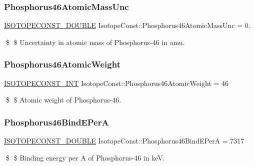 \subsubsection{\texorpdfstring{Phosphorus46\+Atomic\+Mass\+Unc}{Phosphorus46AtomicMassUnc}}
{\footnotesize\ttfamily \mbox{\hyperlink{group___isotope_const-_macros_ga8f45a7272ce02c0b4c65c44636ed719a}{I\+S\+O\+T\+O\+P\+E\+C\+O\+N\+S\+T\+\_\+\+D\+O\+U\+B\+LE}} Isotope\+Const\+::\+Phosphorus46\+Atomic\+Mass\+Unc = 0.}

\$ \$ Uncertainty in atomic mass of Phosphorus-\/46 in amu. \mbox{\label{group___isotope_const-_phosphorus-_p46_ga57d067ce0aacc24abadc3f92997ab879}} 
\subsubsection{\texorpdfstring{Phosphorus46\+Atomic\+Weight}{Phosphorus46AtomicWeight}}
{\footnotesize\ttfamily \mbox{\hyperlink{group___isotope_const-_macros_ga5f18360b3e99483a35c32d789e62621c}{I\+S\+O\+T\+O\+P\+E\+C\+O\+N\+S\+T\+\_\+\+I\+NT}} Isotope\+Const\+::\+Phosphorus46\+Atomic\+Weight = 46}

\$ \$ Atomic weight of Phosphorus-\/46. \mbox{\label{group___isotope_const-_phosphorus-_p46_ga58d6df77a046798b02124f5263f62330}} 
\subsubsection{\texorpdfstring{Phosphorus46\+Bind\+E\+PerA}{Phosphorus46BindEPerA}}
{\footnotesize\ttfamily \mbox{\hyperlink{group___isotope_const-_macros_ga8f45a7272ce02c0b4c65c44636ed719a}{I\+S\+O\+T\+O\+P\+E\+C\+O\+N\+S\+T\+\_\+\+D\+O\+U\+B\+LE}} Isotope\+Const\+::\+Phosphorus46\+Bind\+E\+PerA = 7317}

\$ \$ Binding energy per A of Phosphorus-\/46 in keV. \mbox{\label{group___isotope_const-_phosphorus-_p46_ga9e52e65d41b3114adb88869ff5f3247a}} 
